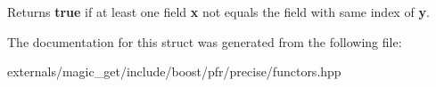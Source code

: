 \begin{DoxyReturn}{Returns}
{\bfseries true} if at least one field {\bfseries x} not equals the field with same index of {\bfseries y}.
\end{DoxyReturn}


The documentation for this struct was generated from the following file\+:\begin{DoxyCompactItemize}
\item 
externals/magic\+\_\+get/include/boost/pfr/precise/functors.\+hpp\end{DoxyCompactItemize}
